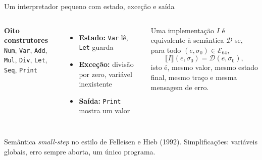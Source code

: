 \documentclass[aspectratio=169,10pt]{beamer}
\begin{document}
\begin{frame}{Um interpretador pequeno com estado, exceção e saída}
  \begin{columns}[T]
    \textbf{Oito construtores}\\[2pt]
    \texttt{Num}, \texttt{Var}, \texttt{Add}, \texttt{Mul}, \texttt{Div}, \texttt{Let}, \texttt{Seq}, \texttt{Print}
    \vspace{6pt}
    \begin{itemize}
      \item \textbf{Estado:} \texttt{Var} lê, \texttt{Let} guarda
      \item \textbf{Exceção:} divisão por zero, variável inexistente
      \item \textbf{Saída:} \texttt{Print} mostra um valor
    \end{itemize}
    \begin{definition}
      Uma implementação $I$ é equivalente à semântica $\mathcal{D}$ se, para todo
      $(e,\sigma_0) \in \mathcal{E}_{64}$,
      \[ \llbracket I \rrbracket(e,\sigma_0) = \mathcal{D}(e,\sigma_0), \]
      isto é, mesmo valor, mesmo estado final, mesmo traço e mesma mensagem de erro.
    \end{definition}
  \end{columns}
  \vfill
  {\small\color{neutral} Semântica \emph{small-step} no estilo de Felleisen e Hieb (1992). Simplificações: variáveis globais, erro sempre aborta, um único programa.}
\end{frame}
\end{document}
